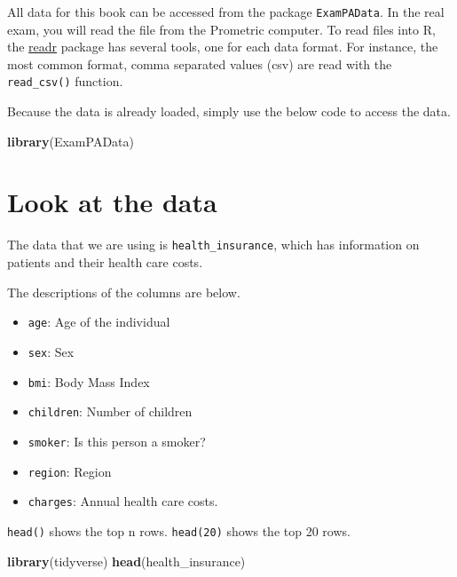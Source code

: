 \documentclass[openany]{book}
\newenvironment{Shaded}{\begin{snugshade}}{\end{snugshade}}
\newcommand{\KeywordTok}[1]{\textcolor[rgb]{0.13,0.29,0.53}{\textbf{#1}}}
\newcommand{\NormalTok}[1]{#1}
\providecommand{\tightlist}{%
  \setlength{\itemsep}{0pt}\setlength{\parskip}{0pt}}
\begin{document}
All data for this book can be accessed from the package \texttt{ExamPAData}. In the real exam, you will read the file from the Prometric computer. To read files into R, the \href{https://readr.tidyverse.org/articles/readr.html}{readr} package has several tools, one for each data format. For instance, the most common format, comma separated values (csv) are read with the \texttt{read\_csv()} function.

Because the data is already loaded, simply use the below code to access the data.

\begin{Shaded}
\begin{Highlighting}[]
\KeywordTok{library}\NormalTok{(ExamPAData)}
\end{Highlighting}
\end{Shaded}

\hypertarget{look-at-the-data}{%
\section{Look at the data}\label{look-at-the-data}}

The data that we are using is \texttt{health\_insurance}, which has information on patients and their health care costs.

The descriptions of the columns are below.

\begin{itemize}
\tightlist
\item
  \texttt{age}: Age of the individual
\item
  \texttt{sex}: Sex
\item
  \texttt{bmi}: Body Mass Index
\item
  \texttt{children}: Number of children
\item
  \texttt{smoker}: Is this person a smoker?
\item
  \texttt{region}: Region
\item
  \texttt{charges}: Annual health care costs.
\end{itemize}

\texttt{head()} shows the top n rows. \texttt{head(20)} shows the top 20 rows.

\begin{Shaded}
\begin{Highlighting}[]
\KeywordTok{library}\NormalTok{(tidyverse)}
\KeywordTok{head}\NormalTok{(health_insurance)}
\end{Highlighting}
\end{Shaded}
\end{document}
